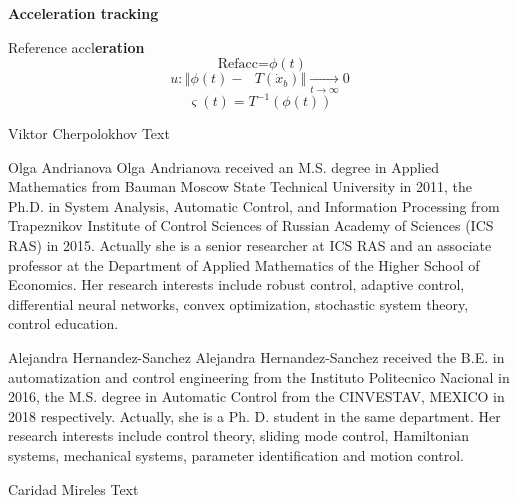 \documentclass[journal,twocolumn]{IEEEtran}
\begin{document}
% 




\textbf{Acceleration tracking}

Reference accl\textbf{eration}%
\begin{equation*}
\text{ Refacc=}\phi \left( t\right) 
\end{equation*}%
\begin{equation*}
u:\left\Vert \phi \left( t\right) -\text{ }T\left( \dot{x}_{b}\right)
\right\Vert \underset{t\rightarrow \infty }{\rightarrow }0 
\end{equation*}%
\begin{equation*}
\varsigma \left( t\right) =T^{-1}\left( \phi \left( t\right) \right) 
\end{equation*}%
\begin{IEEEbiography}{Viktor Cherpolokhov}
Text
\end{IEEEbiography}

\begin{IEEEbiography}{Olga Andrianova}
Olga Andrianova received an M.S. degree in Applied Mathematics from Bauman Moscow State Technical University in 2011, the Ph.D. in System Analysis, Automatic Control, and Information Processing from Trapeznikov Institute of Control Sciences of Russian Academy of Sciences (ICS RAS) in 2015. Actually she is a senior researcher at ICS RAS and an associate professor at the Department of Applied Mathematics of the Higher School of Economics. Her research interests include robust control, adaptive control, differential neural networks, convex optimization, stochastic system theory, control education.
\end{IEEEbiography}
\begin{IEEEbiography}{Alejandra Hernandez-Sanchez}
Alejandra Hernandez-Sanchez received the B.E. in automatization and control engineering from the Instituto Politecnico Nacional in 2016, the M.S. degree in Automatic Control from the CINVESTAV, MEXICO in 2018 respectively. Actually, she is a Ph. D. student in the same department. Her research interests include control theory, sliding mode control, Hamiltonian systems, mechanical systems, parameter identification and motion control.
\end{IEEEbiography}
\begin{IEEEbiography}{Caridad Mireles}
Text
\end{IEEEbiography}
\end{document}
